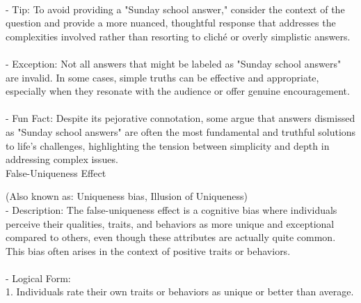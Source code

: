 \documentclass[a4paper,12pt,single,pdftex]{scrbook}
\begin{document}
    
      
    \\

    
      - Tip: To avoid providing a "Sunday school answer," consider the context of the question and provide a more nuanced, thoughtful response that addresses the complexities involved rather than resorting to cliché or overly simplistic answers.
    \\

    
      
    \\

    
      - Exception: Not all answers that might be labeled as "Sunday school answers" are invalid. In some cases, simple truths can be effective and appropriate, especially when they resonate with the audience or offer genuine encouragement.
    \\

    
      
    \\

    
      - Fun Fact: Despite its pejorative connotation, some argue that answers dismissed as "Sunday school answers" are often the most fundamental and truthful solutions to life’s challenges, highlighting the tension between simplicity and depth in addressing complex issues.
    \\

  

False-Uniqueness Effect
    
      (Also known as: Uniqueness bias, Illusion of Uniqueness)
    \\

  
    
      - Description: The false-uniqueness effect is a cognitive bias where individuals perceive their qualities, traits, and behaviors as more unique and exceptional compared to others, even though these attributes are actually quite common. This bias often arises in the context of positive traits or behaviors.
    \\

    
      
    \\

    
      - Logical Form:
    \\

    
        1. Individuals rate their own traits or behaviors as unique or better than average.
    \\
\end{document}
